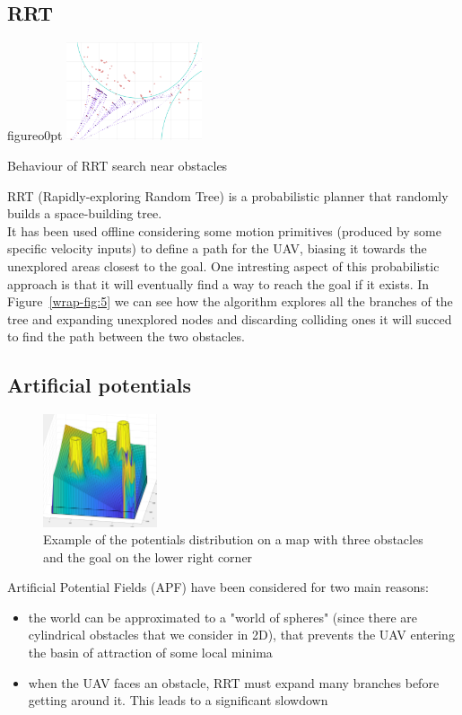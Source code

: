 \documentclass[oneside,onecolumn]{article}
\begin{document}
\subsection{RRT}

\begin{wrapfloat}{figure}{o}{0pt}
  \includegraphics[width=0.3\textwidth]{rrt}
  \caption{Behaviour of RRT search near obstacles}\label{wrap-fig:5}
\end{wrapfloat} 

RRT (Rapidly-exploring Random Tree) is a probabilistic planner that randomly builds a space-building tree.\\
It has been used offline considering some motion primitives (produced by some specific velocity inputs) to define a path for the UAV, biasing it towards the unexplored areas closest to the goal.
One intresting aspect of this probabilistic approach is that it will eventually
find a way to reach the goal if it exists. In Figure~\ref{wrap-fig:5} we can see
how the algorithm explores all the branches of the tree and expanding unexplored
nodes and discarding colliding ones it will succed to find the path between the
two obstacles.
\subsection{Artificial potentials}
\begin{figure}
\centering
\includegraphics[width=0.3\textwidth]{artPotFields}
\caption{Example of the potentials distribution on a map with three obstacles
    and the goal on the lower right corner}
\label{wrap-fig:6}
\end{figure}

Artificial Potential Fields (APF) have been considered for two main reasons:
\begin{itemize}
\item the world can be approximated to a "world of spheres" (since there are cylindrical obstacles that we consider in 2D), that prevents the UAV entering the basin of attraction of some local minima
\item when the UAV faces an obstacle, RRT must expand many branches before getting around it. This leads to a significant slowdown
\end{itemize}
\end{document}
